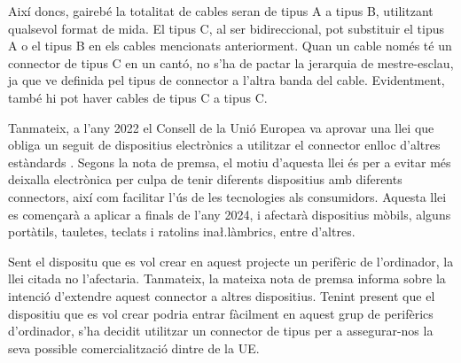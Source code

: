 Així doncs, gairebé la totalitat de cables  seran de tipus A a tipus
B, utilitzant qualsevol format de mida. El tipus C, al ser bidireccional, pot
substituir el tipus A o el tipus B en els cables mencionats anteriorment.
Quan un cable només té un connector de tipus C en un cantó, no s'ha de pactar
la jerarquia de mestre-esclau, ja que ve definida pel tipus de connector a
l'altra banda del cable. Evidentment, també hi pot haver cables de tipus C a
tipus C.

Tanmateix, a l'any 2022 el Consell de la Unió Europea va aprovar una llei
que obliga un seguit de dispositius electrònics a utilitzar el connector
 enlloc d'altres estàndards \cite{Council2022Common}. Segons la
nota de premsa, el motiu d'aquesta llei és per a evitar més deixalla electrònica
per culpa de tenir diferents dispositius amb diferents connectors, així com
facilitar l'ús de les tecnologies als consumidors. Aquesta llei
es començarà a aplicar a finals de l'any 2024, i afectarà dispositius mòbils, 
alguns portàtils, tauletes, teclats i ratolins ina\l.làmbrics, entre
d'altres.

Sent el dispositu que es vol crear en aquest projecte un perifèric de
l'ordinador, la llei citada no l'afectaria. Tanmateix, la mateixa nota de premsa
informa sobre la intenció d'extendre aquest connector a altres dispositius.
Tenint present que el dispositiu que es vol crear podria entrar fàcilment en
aquest grup de perifèrics d'ordinador, s'ha decidit utilitzar un connector de
tipus  per a assegurar-nos la seva possible comercialització dintre
de la UE.

